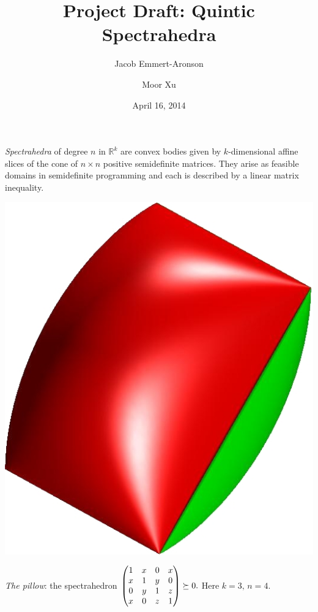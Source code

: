 \documentclass[12pt]{amsart}
\title{Project Draft: Quintic Spectrahedra}
\author{Jacob Emmert-Aronson}
\author{Moor Xu}
\date{April 16, 2014}
\theoremstyle{plain}
\theoremstyle{definition}
\begin{document}
 
\maketitle

\emph{Spectrahedra} of degree $n$ in $\mathbb{R}^k$ are convex bodies
given by $k$-dimensional affine slices of the cone of $n \times n$
positive semidefinite matrices.  They arise as feasible domains in
semidefinite programming and each is described by a linear matrix
inequality.
\vspace\baselineskip

\begin{center}

\includegraphics[scale=.15]{pillow.jpg}
\vspace\baselineskip

{\small
\emph{The pillow}: the spectrahedron
$
\begin{pmatrix}
  1&x&0&x\\
  x&1&y&0\\
  0&y&1&z\\
  x&0&z&1
\end{pmatrix}
\succeq 0\text.$  Here $k=3,\, n=4$.}
\end{center}
\vspace\baselineskip
\end{document}
